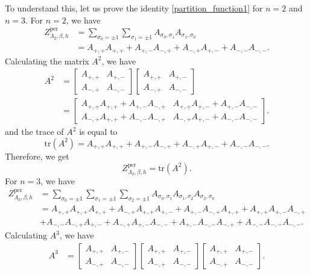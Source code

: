 \documentclass[11pt]{book}
\begin{document}
To understand this, let us prove the identity \eqref{partition_function1} for $n=2$ and $n=3$.
For $n=2$, we have
\begin{align*}
Z^{\text{per}}_{\Lambda_2,\beta,h} &= \sum_{\sigma_0=\pm 1} \sum_{\sigma_1=\pm 1} A_{\sigma_0,\sigma_1} A_{\sigma_1,\sigma_0} \\
&= A_{+,+} A_{+,+} + A_{+,-} A_{-,+} + A_{-,+} A_{+,-} + A_{-,-} A_{-,-}.
\end{align*}
Calculating the matrix $A^2$, we have
\begin{align*}
A^2 &= 
\begin{bmatrix}
A_{+,+} & A_{+,-} \\
A_{-,+} & A_{-,-}
\end{bmatrix} 
\begin{bmatrix}
A_{+,+} & A_{+,-} \\
A_{-,+} & A_{-,-}
\end{bmatrix} \\
&= \begin{bmatrix}
A_{+,+} A_{+,+} + A_{+,-} A_{-,+} & A_{+,+} A_{+,-} + A_{+,-} A_{-,-} \\
A_{-,+} A_{+,+} + A_{-,-} A_{-,+} & A_{-,+} A_{+,-} + A_{-,-} A_{-,-}
\end{bmatrix}.
\end{align*}
and the trace of $A^2$ is equal to
$$
\text{tr}(A^2) = A_{+,+} A_{+,+} + A_{+,-} A_{-,+} + A_{-,+} A_{+,-} + A_{-,-} A_{-,-}.
$$
Therefore, we get 
\begin{equation}\label{trA2}
Z^{\text{per}}_{\Lambda_2,\beta,h} = \text{tr}(A^2).
\end{equation}
For $n=3$, we have
\begin{align*}
Z^{\text{per}}_{\Lambda_3,\beta,h} &= \sum_{\sigma_0=\pm 1} \sum_{\sigma_1=\pm 1} \sum_{\sigma_2=\pm 1} A_{\sigma_0,\sigma_1} A_{\sigma_1,\sigma_2} A_{\sigma_2,\sigma_0} \\
&= A_{+,+} A_{+,+} A_{+,+} + A_{-,+} A_{+,+} A_{+,-} + A_{+,-} A_{-,+} A_{+,+} + A_{+,+} A_{+,-} A_{-,+} \\
&+ A_{-,-} A_{-,+} A_{+,-} + A_{-,+} A_{+,-} A_{-,-} + A_{+,-} A_{-,-} A_{-,+} + A_{-,-} A_{-,-} A_{-,-}.
\end{align*}
Calculating $A^3$, we have
\begin{align*}
A^3 &= 
\begin{bmatrix}
A_{+,+} & A_{+,-} \\
A_{-,+} & A_{-,-}
\end{bmatrix}
\begin{bmatrix}
A_{+,+} & A_{+,-} \\
A_{-,+} & A_{-,-}
\end{bmatrix}
\begin{bmatrix}
A_{+,+} & A_{+,-} \\
A_{-,+} & A_{-,-}
\end{bmatrix}. \\
\end{align*}
\end{document}
